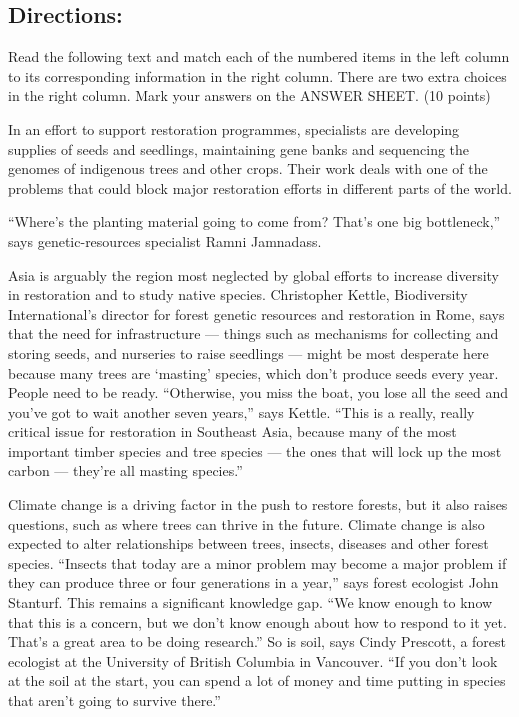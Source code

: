 \documentclass[UTF8,11pt]{ctexart}
\begin{document}
\subsection*{\textbf{Directions:}}


Read the following text and match each of the numbered items in the left column to its corresponding information in the right column. There are two extra choices in the right column. Mark your answers on the ANSWER SHEET. (10 points)


In an effort to support restoration programmes, specialists are developing supplies of seeds and seedlings, maintaining gene banks and sequencing the genomes of indigenous trees and other crops. Their work deals with one of the problems that could block major restoration efforts in different parts of the world.


“Where’s the planting material going to come from? That’s one big bottleneck,” says genetic-resources specialist Ramni Jamnadass.


Asia is arguably the region most neglected by global efforts to increase diversity in restoration and to study native species. Christopher Kettle, Biodiversity International’s director for forest genetic resources and restoration in Rome, says that the need for infrastructure — things such as mechanisms for collecting and storing seeds, and nurseries to raise seedlings — might be most desperate here because many trees are ‘masting’ species, which don’t produce seeds every year. People need to be ready. “Otherwise, you miss the boat, you lose all the seed and you’ve got to wait another seven years,” says Kettle. “This is a really, really critical issue for restoration in Southeast Asia, because many of the most important timber species and tree species — the ones that will lock up the most carbon — they’re all masting species.”


Climate change is a driving factor in the push to restore forests, but it also raises questions, such as where trees can thrive in the future. Climate change is also expected to alter relationships between trees, insects, diseases and other forest species. “Insects that today are a minor problem may become a major problem if they can produce three or four generations in a year,” says forest ecologist John Stanturf. This remains a significant knowledge gap. “We know enough to know that this is a concern, but we don’t know enough about how to respond to it yet. That’s a great area to be doing research.” So is soil, says Cindy Prescott, a forest ecologist at the University of British Columbia in Vancouver. “If you don’t look at the soil at the start, you can spend a lot of money and time putting in species that aren’t going to survive there.”
\end{document}
